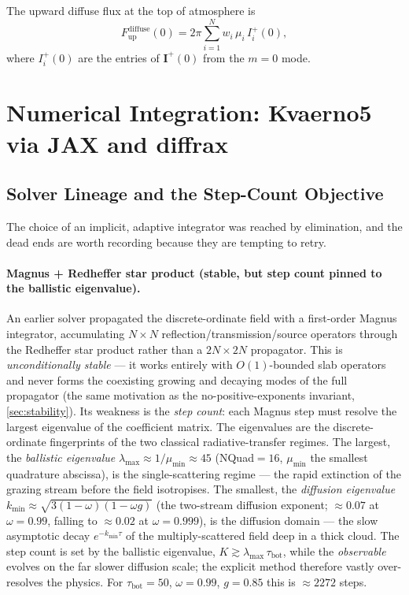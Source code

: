 \documentclass[11pt,a4paper]{article}
\newcommand{\vect}[1]{\bm{#1}}
\newcommand{\tbot}{\tau_{\mathrm{bot}}}
\theoremstyle{definition}
\begin{document}
The upward diffuse flux at the top of atmosphere is
\begin{equation}\label{eq:flux}
  F_{\mathrm{up}}^{\mathrm{diffuse}}(0)
  = 2\pi \sum_{i=1}^{N} w_i\,\mu_i\, I^+_i(0),
\end{equation}
where $I^+_i(0)$ are the entries of $\vect{I}^+(0)$ from the $m=0$ mode.

\section{Numerical Integration: Kvaerno5 via JAX and diffrax}\label{sec:kvaerno5}

\subsection{Solver Lineage and the Step-Count Objective}\label{sec:lineage}

The choice of an implicit, adaptive integrator was reached by elimination,
and the dead ends are worth recording because they are tempting to retry.

\paragraph{Magnus + Redheffer star product (stable, but step count pinned
to the ballistic eigenvalue).}
An earlier solver propagated the discrete-ordinate field with a
first-order Magnus integrator, accumulating $N\!\times\!N$
reflection/transmission/source operators through the Redheffer star
product rather than a $2N\!\times\!2N$ propagator.  This is
\emph{unconditionally stable} --- it works entirely with $O(1)$-bounded
slab operators and never forms the coexisting growing and decaying modes
of the full propagator (the same motivation as the no-positive-exponents
invariant, \cref{sec:stability}).  Its weakness is the \emph{step count}:
each Magnus step must resolve the largest eigenvalue of the coefficient
matrix.  The eigenvalues are the discrete-ordinate fingerprints of the
two classical radiative-transfer regimes.  The largest, the
\emph{ballistic eigenvalue} $\lambda_{\max}\approx 1/\mu_{\min}\approx 45$
(NQuad${}=16$, $\mu_{\min}$ the smallest quadrature abscissa), is the
single-scattering regime --- the rapid extinction of the grazing stream
before the field isotropises.  The smallest, the \emph{diffusion
eigenvalue} $k_{\min}\approx\sqrt{3(1-\omega)(1-\omega g)}$ (the two-stream
diffusion exponent; $\approx 0.07$ at $\omega=0.99$, falling to
$\approx 0.02$ at $\omega=0.999$), is the diffusion domain --- the slow
asymptotic decay $e^{-k_{\min}\tau}$ of the multiply-scattered field deep
in a thick cloud.  The step count is set by the ballistic eigenvalue,
$K \gtrsim \lambda_{\max}\,\tbot$, while the \emph{observable} evolves on
the far slower diffusion scale; the explicit method therefore vastly
over-resolves the physics.  For $\tbot=50$, $\omega=0.99$, $g=0.85$ this
is $\approx 2272$ steps.
\end{document}
